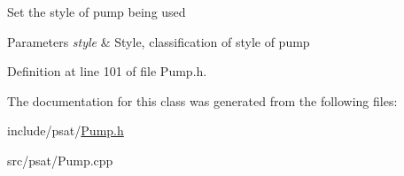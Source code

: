 Set the style of pump being used


\begin{DoxyParams}{Parameters}
{\em style} & Style, classification of style of pump \\
\hline
\end{DoxyParams}


Definition at line 101 of file Pump.\+h.



The documentation for this class was generated from the following files\+:\begin{DoxyCompactItemize}
\item 
include/psat/\hyperlink{_pump_8h}{Pump.\+h}\item 
src/psat/Pump.\+cpp\end{DoxyCompactItemize}
